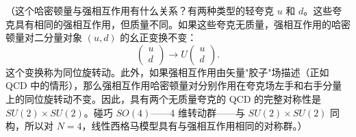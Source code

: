 （这个哈密顿量与强相互作用有什么关系？有两种类型的轻夸克 $u$ 和 $d$。这些夸克具有相同的强相互作用，但质量不同。如果这些夸克无质量，强相互作用的哈密顿量对二分量对象 $(u,d)$ 的幺正变换不变：
\begin{equation}
  \begin{pmatrix}u\\ d\end{pmatrix} \to U\begin{pmatrix}u\\ d\end{pmatrix} .
\end{equation}
这个变换称为同位旋转动。此外，如果强相互作用由矢量"胶子"场描述（正如 QCD 中的情形），那么强相互作用哈密顿量对分别作用在夸克场左手和右手分量上的同位旋转动不变。因此，具有两个无质量夸克的 QCD 的完整对称性是 $SU(2)\times SU(2)$。碰巧 $SO(4)$——4 维转动群——与 $SU(2)\times SU(2)$ 同构，所以对 $N=4$，线性西格马模型具有与强相互作用相同的对称群。）

